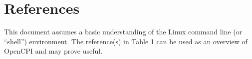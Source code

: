 \newpage

\tableofcontents

\def\assetsdoc{\noindent For more information on this application, see \code{ocpi.assets}'s more in-depth version of the \textit{FSK\_app} document.}

\newpage

\section{References}

	This document assumes a basic understanding of the Linux command line (or ``shell'') environment.  The reference(s) in Table 1 can be used as an overview of OpenCPI and may prove useful.

\def\myreferences{
\hline
FSK App\footnote{Provides details of the ``FSK App'' reference application} & \path{FSK_app.pdf}\\
}


